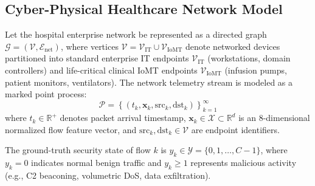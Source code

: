 \documentclass{ieeeaccess}
\begin{document}
\subsection{Cyber-Physical Healthcare Network Model}
Let the hospital enterprise network be represented as a directed graph $\mathcal{G} = (\mathcal{V}, \mathcal{E}_{\text{net}})$, where vertices $\mathcal{V} = \mathcal{V}_{\text{IT}} \cup \mathcal{V}_{\text{IoMT}}$ denote networked devices partitioned into standard enterprise IT endpoints $\mathcal{V}_{\text{IT}}$ (workstations, domain controllers) and life-critical clinical IoMT endpoints $\mathcal{V}_{\text{IoMT}}$ (infusion pumps, patient monitors, ventilators). The network telemetry stream is modeled as a marked point process:
\begin{equation}
\mathcal{P} = \left\{ (t_k, \mathbf{x}_k, \text{src}_k, \text{dst}_k) \right\}_{k=1}^{\infty}
\end{equation}
where $t_k \in \mathbb{R}^+$ denotes packet arrival timestamp, $\mathbf{x}_k \in \mathcal{X} \subset \mathbb{R}^d$ is an 8-dimensional normalized flow feature vector, and $\text{src}_k, \text{dst}_k \in \mathcal{V}$ are endpoint identifiers.

The ground-truth security state of flow $k$ is $y_k \in \mathcal{Y} = \{0, 1, \dots, C-1\}$, where $y_k = 0$ indicates normal benign traffic and $y_k \ge 1$ represents malicious activity (e.g., C2 beaconing, volumetric DoS, data exfiltration).
\end{document}
